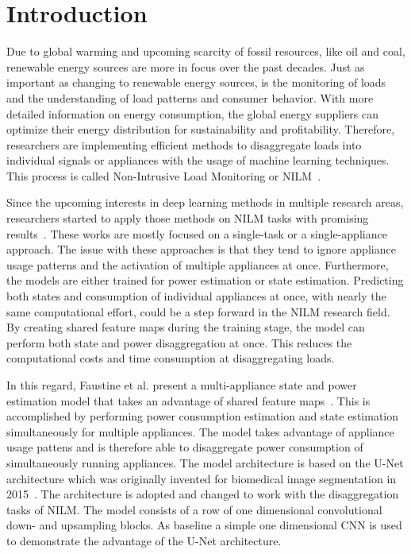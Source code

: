 \documentclass[sigconf]{acmart}
\begin{document}
\maketitle



\section{Introduction}
Due to global warming and upcoming scarcity of fossil resources, like oil and coal, renewable energy sources are more in focus over the past decades.
Just as important as changing to renewable energy sources, is the monitoring of loads and the understanding of load patterns and consumer behavior.
With more detailed information on energy consumption, the global energy suppliers can optimize their energy distribution for sustainability and profitability. %
Therefore, researchers are implementing efficient methods to disaggregate loads into individual signals or appliances with the usage of machine learning techniques.
This process is called Non-Intrusive Load Monitoring or NILM~\cite{Zoha2012NonIntrusiveLM}.

Since the upcoming interests in deep learning methods in multiple research areas, researchers started to apply those methods on NILM tasks with promising results~\cite{WaveNilm, PB-NILM, DBLP, SlidingWindow, sequencetopoint}.
These works are mostly focused on a single-task or a single-appliance approach.
The issue with these approaches is that they tend to ignore appliance usage patterns and the activation of multiple appliances at once.
Furthermore, the models are either trained for power estimation or state estimation. 
Predicting both states and consumption of individual appliances at once, with nearly the same computational effort, could be a step forward in the NILM research field.
By creating shared feature maps during the training stage, the model can perform both state and power disaggregation at once.
This reduces the computational costs and time consumption at disaggregating loads.

In this regard, Faustine et al. present a multi-appliance state and power estimation model that takes an advantage of shared feature maps~\cite{unetnilm}.
This is accomplished by performing power consumption estimation and state estimation simultaneously for multiple appliances.
The model takes advantage of appliance usage pattens and is therefore able to disaggregate power consumption of simultaneously running appliances. 
The model architecture is based on the U-Net architecture which was originally invented for biomedical image segmentation in 2015~\cite{unet}.
The architecture is adopted and changed to work with the disaggregation tasks of NILM.
The model consists of a row of one dimensional convolutional down- and upsampling blocks.
As baseline a simple one dimensional CNN is used to demonstrate the advantage of the U-Net architecture.
\end{document}
